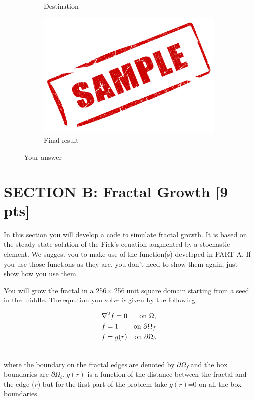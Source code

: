\documentclass[paper=a4, fontsize=12pt]{scrartcl} %
\numberwithin{equation}{section}       %
\numberwithin{figure}{section}         %
\numberwithin{table}{section}          %
\begin{document}
\begin{figure}[H]
\begin{subfigure}[b]{0.40\textwidth}
        \caption{ Destination}
    \end{subfigure}
    \begin{subfigure}[b]{0.70\textwidth}
        \includegraphics[width=\textwidth]{sample}
        \caption{ Final result}
    \end{subfigure}
    \caption{Your answer}
    \label{fig:1}
\end{figure}

\newpage
\section{SECTION B: Fractal Growth [9 pts]}
In this section you will develop a code to simulate  fractal growth. It is based on the steady state solution of the Fick's equation  augmented by a stochastic element.  We suggest you to make use of the function(s) developed in PART A. If you use those functions as they are, you don't need to show them again, just show how you use them.

You will grow the fractal in a 256$\times$ 256 unit square domain starting from a seed in the middle.
The equation you solve is given by the following:

\begin{align}
&\nabla^2 f= 0 & \text{on } \Omega, \\ \notag
& f=1 &  \text{on } \partial \Omega_f \\ \notag
& f=g(r) &  \text{on } \partial \Omega_b \\ \notag
\end{align}

where the boundary on the fractal edges are denoted by $\partial \Omega_f$ and the box boundaries are $ \partial \Omega_b$.  $g(r)$ is a function of the distance between the fractal and the edge ($r$) but for the first part of the problem take $g(r)$=0 on all the  box boundaries.
\end{document}
